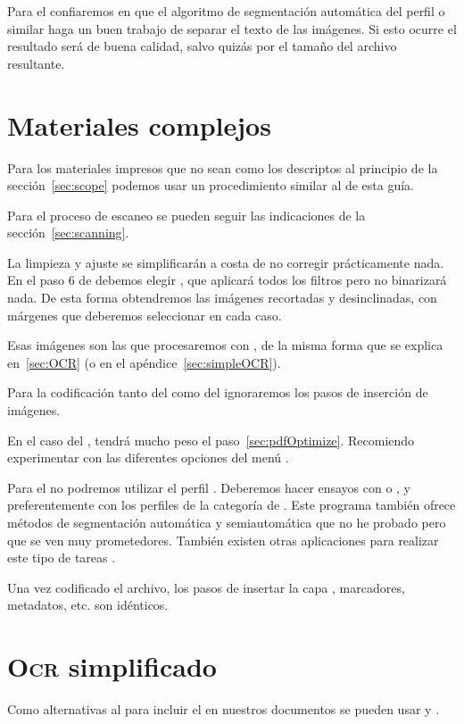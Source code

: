 \documentclass[%
	a5paper,
	10pt,
	twoside,
	openright,
	final,
]{memoir}
\begin{document}
{	Para el \djvu confiaremos en que el algoritmo de segmentación automática del perfil  o similar haga un buen trabajo de separar el texto de las imágenes. Si esto ocurre el resultado será de buena calidad, salvo quizás por el tamaño del archivo resultante.

	\chapter{Materiales complejos\label{sec:complexScans}} Para los materiales impresos que no sean como los descriptos al principio de la sección~\ref{sec:scope} podemos usar un procedimiento similar al de esta guía.

	Para el proceso de escaneo se pueden seguir las indicaciones de la sección~\ref{sec:scanning}.

	La limpieza y ajuste se simplificarán a costa de no corregir prácticamente nada. En el paso 6 de \scantailor debemos elegir , que aplicará todos los filtros pero no binarizará nada. De esta forma obtendremos las imágenes recortadas y desinclinadas, con márgenes que deberemos seleccionar en cada caso.

	Esas imágenes son las que procesaremos con \abbyy, de la misma forma que se explica en~\ref{sec:OCR} (o en el apéndice~\ref{sec:simpleOCR}).

	Para la codificación tanto del \pdf como del \djvu ignoraremos los pasos de inserción de imágenes.

	En el caso del \pdf, tendrá mucho peso el paso~\ref{sec:pdfOptimize}. Recomiendo experimentar con las diferentes opciones del menú .

	Para el \djvu no podremos utilizar el perfil . Deberemos hacer ensayos con  o , y preferentemente con los perfiles de la categoría  de \djvusmallmod. Este programa también ofrece métodos de segmentación automática y semiautomática que no he probado pero que se ven muy prometedores. También existen otras aplicaciones para realizar este tipo de tareas \cite{didjvu}.

	Una vez codificado el archivo, los pasos de insertar la capa \ocr, marcadores, metadatos, etc. son idénticos.

	\chapter{\texorpdfstring{\textsc{Ocr}}{OCR} simplificado\label{sec:simpleOCR}} Como alternativas al \abbyy para incluir el \ocr en nuestros documentos se pueden usar \acrobat y \djvueditor.

}
\end{document}
